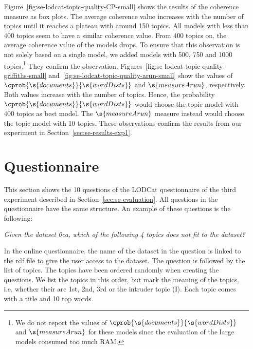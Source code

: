 


Figure~\ref{fig:se-lodcat-topic-quality-CP-small} shows the results of the coherence measure as box plots. The average coherence value increases with the number of topics until it reaches a plateau with around 150 topics. All models with less than 400 topics seem to have a similar coherence value. From 400 topics on, the average coherence value of the models drops. To ensure that this observation is not solely based on a single model, we added models with 500, 750 and 1000 topics.\footnote{We do not report the values of $\cprob{\s{documents}}{\s{wordDists}}$ and $\s{measureArun}$ for these models since the evaluation of the large models consumed too much RAM.} They confirm the observation.
Figures~\ref{fig:se-lodcat-topic-quality-griffiths-small} and~\ref{fig:se-lodcat-topic-quality-arun-small} show the values of $\cprob{\s{documents}}{\s{wordDists}}$ and $\s{measureArun}$, respectively. Both values increase with the number of topics. Hence, the probability $\cprob{\s{documents}}{\s{wordDists}}$ would choose the topic model with 400 topics as best model. The $\s{measureArun}$ measure instead would choose the topic model with 10 topics. These observations confirm the results from our experiment in Section~\ref{sec:se-results-exp1}.


\section{Questionnaire}
\label{sec:ap-lodcat-questionnaire}

This section shows the 10 questions of the LODCat questionnaire of the third experiment described in Section~\ref{sec:se-evaluation}. All questions in the questionnaire have the same structure. An example of these questions is the following:

\emph{Given the dataset 0ca, which of the following 4 topics does not fit to the dataset?}

In the online questionnaire, the name of the dataset in the question is linked to the \gls{rdf} file to give the user access to the dataset. The question is followed by the list of topics. The topics have been ordered randomly when creating the questions. We list the topics in this order, but mark the meaning of the topics, i.e, whether their are 1st, 2nd, 3rd or the intruder topic (I). Each topic comes with a title and 10 top words.

